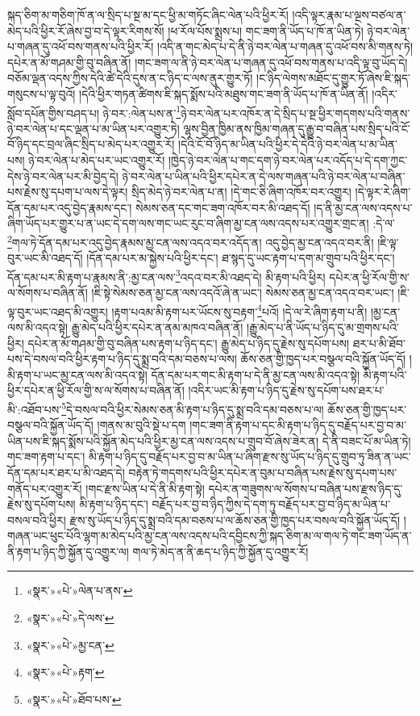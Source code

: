 སྐད་ཅིག་མ་གཅིག་ཁོ་ན་ལ་སྲིད་པ་སྔ་མ་དང་ཕྱི་མ་གཏོང་ཞིང་ལེན་པའི་ཕྱིར་རོ། །འདི་ལྟར་རྣམ་པ་ལྔས་བཙལ་ན་མེད་པའི་ཕྱིར་རོ་ཞེས་བྱ་བ་དེ་ལྟར་རིགས་སོ། །ཕ་རོལ་པོས་སྨྲས་པ། གང་ཟག་ནི་ཡོད་པ་ཁོ་ན་ཡིན་ཏེ། ཉེ་བར་ལེན་པ་གཞན་དུ་འཕོ་བས་གནས་པའི་ཕྱིར་རོ། །འདི་ན་གང་མེད་པ་དེ་ནི་ཉེ་བར་ལེན་པ་གཞན་དུ་འཕོ་བས་མི་གནས་ཏེ། དཔེར་ན་མོ་གཤམ་གྱི་བུ་བཞིན་ནོ། །གང་ཟག་ལ་ནི་ཉེ་བར་ལེན་པ་གཞན་དུ་འཕོ་བས་གནས་པ་འདི་ལྟ་བུ་ཡོད་དེ། བཅོམ་ལྡན་འདས་ཀྱིས་དེའི་ཚེ་དེའི་དུས་ན་ང་ཉིད་ང་ལས་ནུར་གྱུར་ཏོ། །ང་ཉིད་ལེགས་མཐོང་དུ་གྱུར་ཏོ་ཞེས་ཇི་སྐད་གསུངས་པ་ལྟ་བུའོ། །དེའི་ཕྱིར་གཏན་ཚིགས་ཇི་སྐད་སྨོས་པའི་མཐུས་གང་ཟག་ནི་ཡོད་པ་ཁོ་ན་ཡིན་ནོ། །འདིར་སློབ་དཔོན་གྱིས་བཤད་པ། ཉེ་བར་:ལེན་པས་ན་\footnote{«སྣར་»«པེ་»ལེན་པ་ནས་}ཉེ་བར་ལེན་པར་འཁོར་ན་དེ་སྲིད་པ་སྔ་ཕྱིར་གདགས་པའི་གནས་ཉེ་བར་ལེན་པ་དང་ལྡན་པ་མ་ཡིན་པར་འགྱུར་ཏེ། ལྷས་བྱིན་ཁྱིམ་ནས་ཁྱིམ་གཞན་དུ་རྒྱུ་བ་བཞིན་པས་སྲིད་པའི་ངོ་བོ་ཉིད་དང་བྲལ་ཞིང་སྲིད་པ་མེད་པར་འགྱུར་རོ། །དེའི་ངོ་བོ་ཉིད་མ་ཡིན་པའི་ཕྱིར་དེ་དེའི་ཉེ་བར་ལེན་པ་མ་ཡིན་པས། ཉེ་བར་ལེན་པ་མེད་པར་ཡང་འགྱུར་རོ། །ཁྱེད་ཉེ་བར་ལེན་པ་གང་དག་ཉེ་བར་ལེན་པར་འདོད་པ་དེ་དག་ཀྱང་དེས་ཉེ་བར་ལེན་པར་མི་བྱེད་དེ། ཉེ་བར་ལེན་པ་ཡིན་པའི་ཕྱིར་དཔེར་ན་དེ་ལས་གཞན་པའི་ཉེ་བར་ལེན་པ་བཞིན་པས་རྗེས་སུ་དཔག་པ་ལས་དེ་ལྟར། སྲིད་མེད་ཉེ་བར་ལེན་པ་ན། །དེ་གང་ཅི་ཞིག་འཁོར་བར་འགྱུར། །དེ་ལྟར་རེ་ཞིག་དོན་དམ་པར་འདུ་བྱེད་རྣམས་དང་། སེམས་ཅན་དང་གང་ཟག་འཁོར་བར་མི་འཐད་དོ། །ད་ནི་མྱ་ངན་ལས་འདས་པ་ཞིག་ཡོད་པར་གྱུར་པ་ན་ཡང་དེ་དག་ལས་གང་ཡང་རུང་བ་ཞིག་མྱ་ངན་ལས་འདས་པར་འགྱུར་གྲང་ན། :དེ་ལ་\footnote{«སྣར་»«པེ་»དེ་ལས་}གལ་ཏེ་དོན་དམ་པར་འདུ་བྱེད་རྣམས་མྱ་ངན་ལས་འདའ་བར་འདོད་ན། འདུ་བྱེད་མྱ་ངན་འདའ་བར་ནི། །ཇི་ལྟ་བུར་ཡང་མི་འཐད་དོ། །དོན་དམ་པར་མ་སྐྱེས་པའི་ཕྱིར་དང་། ཐ་སྙད་དུ་ཡང་རྟག་པ་དག་མ་གྲུབ་པའི་ཕྱིར་དང་། དོན་དམ་པར་མི་རྟག་པ་རྣམས་ནི་:མྱ་ངན་ལས་\footnote{«སྣར་»«པེ་»མྱ་ངན་}འདའ་བར་མི་འཐད་དེ། མི་རྟག་པའི་ཕྱིར། དཔེར་ན་ཕྱི་རོལ་གྱི་ས་ལ་སོགས་པ་བཞིན་ནོ། །ཇི་སྟེ་སེམས་ཅན་མྱ་ངན་ལས་འདའོ་ཞེ་ན་ཡང་། སེམས་ཅན་མྱ་ངན་འདའ་བར་ཡང་། །ཇི་ལྟ་བུར་ཡང་འཐད་མི་འགྱུར། །རྟག་པའམ་མི་རྟག་པར་ཡོངས་སུ་བརྟག་\footnote{«སྣར་»«པེ་»རྟག་}པའོ། །དེ་ལ་རེ་ཞིག་རྟག་པ་ནི། །མྱ་ངན་ལས་མི་འདའ་སྟེ། རྒྱུ་མེད་པའི་ཕྱིར་དཔེར་ན་ནམ་མཁའ་བཞིན་ནོ། །རྒྱུ་མེད་པ་ནི་ཡོད་པ་ཉིད་དུ་མ་གྲགས་པའི་ཕྱིར། དཔེར་ན་མོ་གཤམ་གྱི་བུ་བཞིན་པས་རྟག་པ་ཉིད་དང་། རྒྱུ་མེད་པ་ཉིད་དུ་རྗེས་སུ་དཔོག་པས། ཐར་པ་མི་ཐོབ་པས་དེ་བསལ་བའི་ཕྱིར་རྟག་པ་ཉིད་དུ་སྨྲ་བའི་དམ་བཅས་པ་ལས། ཆོས་ཅན་གྱི་ཁྱད་པར་བསྩལ་བའི་སྐྱོན་ཡོད་དོ། །མི་རྟག་པ་ཡང་མྱ་ངན་ལས་མི་འདའ་སྟེ། དོན་དམ་པར་གང་མི་རྟག་པ་དེ་ནི་མྱ་ངན་ལས་མི་འདའ་སྟེ། མི་རྟག་པའི་ཕྱིར་དཔེར་ན་ཕྱི་རོལ་གྱི་ས་ལ་སོགས་པ་བཞིན་ནོ། །འདིར་ཡང་མི་རྟག་པ་ཉིད་དུ་རྗེས་སུ་དཔོག་པས་ཐར་པ་མི་:འཐོབ་པས་\footnote{«སྣར་»«པེ་»ཐོབ་པས་}དེ་བསལ་བའི་ཕྱིར་སེམས་ཅན་མི་རྟག་པ་ཉིད་དུ་སྨྲ་བའི་དམ་བཅས་པ་ལ། ཆོས་ཅན་གྱི་ཁྱད་པར་བསྩལ་བའི་སྐྱོན་ཡོད་དོ། །གནས་མ་བུའི་སྡེ་པ་དག །གང་ཟག་ནི་རྟག་པ་དང་མི་རྟག་པ་ཉིད་དུ་བརྗོད་པར་བྱ་བ་མ་ཡིན་པས་ཇི་སྐད་སྨོས་པའི་སྐྱོན་མེད་པའི་ཕྱིར་མྱ་ངན་ལས་འདས་པ་གྲུབ་བོ་ཞེས་ཟེར་ན། དེ་ནི་བཟང་པོ་མ་ཡིན་ཏེ། གང་ཟག་རྟག་པ་དང་། མི་རྟག་པ་ཉིད་དུ་བརྗོད་པར་བྱ་བ་མ་ཡིན་པ་ཞིག་རྫས་སུ་ཡོད་པ་ཉིད་དུ་གྲུབ་ཏུ་ཟིན་ན་ཡང་དོན་དམ་པར་ཐར་པ་མི་འཐད་དེ། བརྟེན་ཏེ་གདགས་པའི་ཕྱིར་དཔེར་ན་བུམ་པ་བཞིན་པས་རྗེས་སུ་དཔག་པས་གནོད་པར་འགྱུར་རོ། །གང་རྫས་ཡིན་པ་དེ་ནི་མི་རྟག་སྟེ། དཔེར་ན་གཟུགས་ལ་སོགས་པ་བཞིན་པས་རྫས་ཉིད་དུ་རྗེས་སུ་དཔོག་པས། མི་རྟག་པ་ཉིད་དང་། བརྗོད་པར་བྱ་བ་ཉིད་ཀྱིས་དེ་དག་ཏུ་བརྗོད་པར་བྱ་བ་ཉིད་མ་ཡིན་པ་བསལ་བའི་ཕྱིར། རྫས་སུ་ཡོད་པ་ཉིད་དུ་སྨྲ་བའི་དམ་བཅས་པ་ལ་ཆོས་ཅན་གྱི་ཁྱད་པར་བསལ་བའི་སྐྱོན་ཡོད་དོ། །གཞན་ཡང་ཕུང་པོའི་ལྷག་མ་མེད་པའི་མྱ་ངན་ལས་འདས་པའི་དབྱིངས་ཀྱི་སྐད་ཅིག་མ་ལ་གལ་ཏེ་གང་ཟག་ཡོད་ན་ནི་རྟག་པ་ཉིད་ཀྱི་སྐྱོན་དུ་འགྱུར་ལ། གལ་ཏེ་མེད་ན་ནི་ཆད་པ་ཉིད་ཀྱི་སྐྱོན་དུ་འགྱུར་རོ། 
